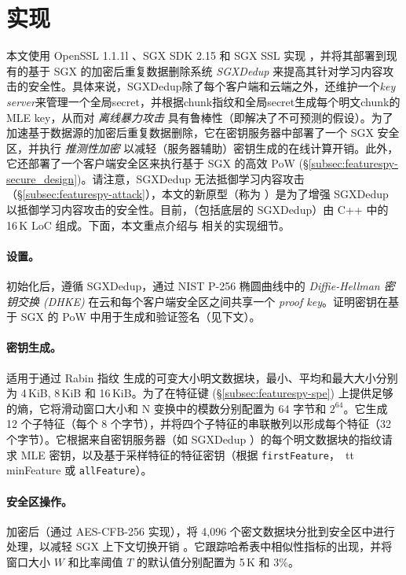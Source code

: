 \section{实现}
\label{sec:featurespy-implementation}
本文使用 OpenSSL 1.1.1l \cite{openssl}、SGX SDK 2.15 \cite{sgxsdk} 和 SGX SSL \cite{sgxssl} 实现 \sysnameF，并将其部署到现有的基于 SGX 的加密后重复数据删除系统 {\em SGXDedup} \cite{ren21} 来提高其针对学习内容攻击的安全性。具体来说，SGXDedup除了每个客户端和云端之外，还维护一个{\em key server}来管理一个全局secret，并根据chunk指纹和全局secret生成每个明文chunk的MLE key，从而对 {\em 离线暴力攻击} 具有鲁棒性（即解决了不可预测的假设）\cite{bellare2013DupLESS}。为了加速基于数据源的加密后重复数据删除，它在密钥服务器中部署了一个 SGX 安全区，并执行 {\em 推测性加密} \cite{eduardo2019Speculative} 以减轻（服务器辅助）密钥生成的在线计算开销。此外，它还部署了一个客户端安全区来执行基于 SGX 的高效 PoW (\S\ref{subsec:featurespy-secure_design})。请注意，SGXDedup 无法抵御学习内容攻击（\S\ref{subsec:featurespy-attack}），本文的新原型（称为 \prototype）是为了增强 SGXDedup 以抵御学习内容攻击的安全性。目前，\prototype（包括底层的 SGXDedup）由 C++ 中的 16\,K LoC 组成。下面，本文重点介绍与 \prototype 相关的实现细节。


\paragraph*{设置。}
初始化后，\prototype 遵循 SGXDedup，通过 NIST P-256 椭圆曲线中的 {\em Diffie-Hellman 密钥交换 (DHKE)} 在云和每个客户端安全区之间共享一个 {\em proof key}。证明密钥在基于 SGX 的 PoW 中用于生成和验证签名（见下文）。


\paragraph*{密钥生成。}
\prototype 适用于通过 Rabin 指纹 \cite{rabin81} 生成的可变大小明文数据块，最小、平均和最大大小分别为 4\,KiB, 8\,KiB 和 16\,KiB。为了在特征键 (\S\ref{subsec:featurespy-spe}) 上提供足够的熵，它将滑动窗口大小和 N 变换中的模数分别配置为 64 字节和 $2^{64}$。它生成 12 个子特征（每个 8 个字节），并将四个子特征的串联散列以形成每个特征（32 个字节）。它根据来自密钥服务器（如 SGXDedup \cite{ren21}）的每个明文数据块的指纹请求 MLE 密钥，以及基于采样特征的特征密钥（根据 {\tt firstFeature}，{\ tt minFeature} 或 {\tt allFeature}）。


\paragraph*{安全区操作。}
加密后（通过 AES-CFB-256 实现），\prototype 将 4,096 个密文数据块分批到安全区中进行处理，以减轻 SGX 上下文切换开销 \cite{arnautov2016SCONE}。它跟踪哈希表中相似性指标的出现，并将窗口大小 $W$ 和比率阈值 $T$ 的默认值分别配置为 5\,K 和 3\%。

